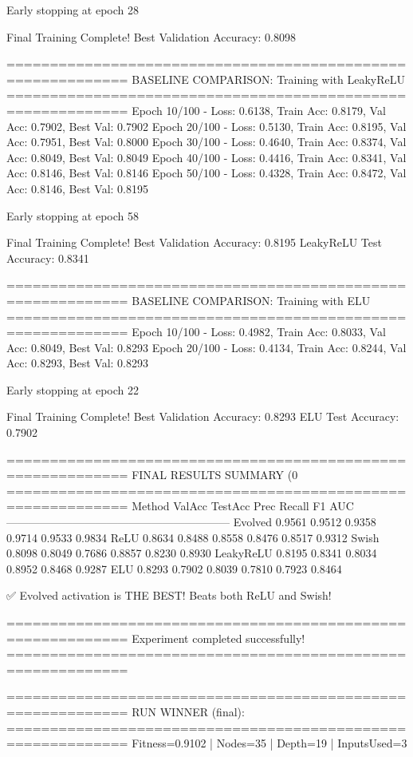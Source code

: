 Early stopping at epoch 28

Final Training Complete!
Best Validation Accuracy: 0.8098

============================================================
BASELINE COMPARISON: Training with LeakyReLU
============================================================
Epoch  10/100 - Loss: 0.6138, Train Acc: 0.8179, Val Acc: 0.7902, Best Val: 0.7902
Epoch  20/100 - Loss: 0.5130, Train Acc: 0.8195, Val Acc: 0.7951, Best Val: 0.8000
Epoch  30/100 - Loss: 0.4640, Train Acc: 0.8374, Val Acc: 0.8049, Best Val: 0.8049
Epoch  40/100 - Loss: 0.4416, Train Acc: 0.8341, Val Acc: 0.8146, Best Val: 0.8146
Epoch  50/100 - Loss: 0.4328, Train Acc: 0.8472, Val Acc: 0.8146, Best Val: 0.8195

Early stopping at epoch 58

Final Training Complete!
Best Validation Accuracy: 0.8195
LeakyReLU Test Accuracy: 0.8341

============================================================
BASELINE COMPARISON: Training with ELU
============================================================
Epoch  10/100 - Loss: 0.4982, Train Acc: 0.8033, Val Acc: 0.8049, Best Val: 0.8293
Epoch  20/100 - Loss: 0.4134, Train Acc: 0.8244, Val Acc: 0.8293, Best Val: 0.8293

Early stopping at epoch 22

Final Training Complete!
Best Validation Accuracy: 0.8293
ELU Test Accuracy: 0.7902

============================================================
FINAL RESULTS SUMMARY (0%
============================================================
Method             ValAcc     TestAcc    Prec       Recall     F1         AUC
------------------------------------------------------------
Evolved            0.9561     0.9512     0.9358     0.9714     0.9533     0.9834
ReLU               0.8634     0.8488     0.8558     0.8476     0.8517     0.9312
Swish              0.8098     0.8049     0.7686     0.8857     0.8230     0.8930
LeakyReLU          0.8195     0.8341     0.8034     0.8952     0.8468     0.9287
ELU                0.8293     0.7902     0.8039     0.7810     0.7923     0.8464

✅ Evolved activation is THE BEST! Beats both ReLU and Swish!

============================================================
Experiment completed successfully!
============================================================

============================================================
RUN WINNER (final):
============================================================
Fitness=0.9102 | Nodes=35 | Depth=19 | InputsUsed=3

